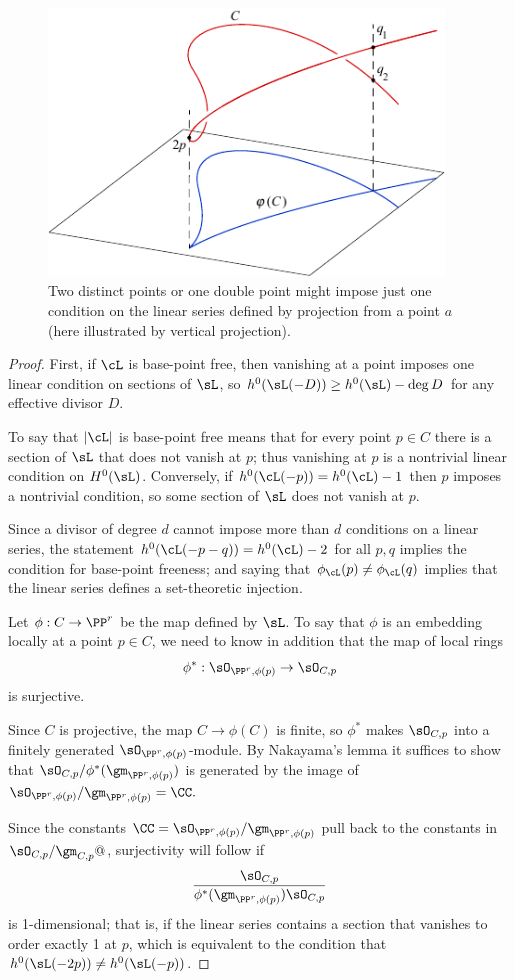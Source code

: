 \begin{figure}
\centerline {\includegraphics[height=2.8in]{"main/Fig01-3"}}
 \caption{Two distinct points or one double point might impose just
   one condition on the linear series defined by projection from a
   point $a$ (here illustrated by vertical projection).
}
\label{not very ample}
\end{figure}

\begin{proof}
First, if $\cL$ is base-point free, then vanishing at a point imposes one linear condition on sections of $\sL$, so
$h^0(\sL(-D)) \geq h^0(\sL)-\deg D$ for any
effective divisor $D$.

To say that $|\cL|$ is base-point free means that for every point $p\in C$ there is a section of $\sL$ that does not vanish at $p$; thus vanishing
at $p$ is a nontrivial linear condition on $H^0(\sL)$. Conversely, if $h^0(\cL(-p)) = h^0(\cL) - 1$ then $p$ imposes a nontrivial condition, so
some section of $\sL$ does not vanish at $p$.

Since a divisor of degree $d$ cannot impose more than $d$ conditions
%
on a linear series, the statement $h^0(\cL(-p-q)) = h^0(\cL) - 2$ for
all $p, q$ implies the condition for base-point freeness; and saying
that $\phi_\cL(p) \neq \phi_\cL(q)$ implies that the linear series
defines a set-theoretic injection.

Let $\phi:C \to \PP^r$ be the map defined by $\sL$. To say that $\phi$  is an embedding locally at a point $p\in C$, we need to know
in addition that the map of local rings
$$
\phi^*: \sO_{\PP^r,\phi(p)} \to \sO_{C,p}
$$
is surjective.

Since $C$ is projective, the map $C\to \phi(C)$ is finite,
so $\phi^*$ makes $\sO_{C,p}$ into a finitely generated $\sO_{\PP^r,\phi(p)}$-module.
By Nakayama's lemma it suffices to show that
$\sO_{C,p}/\phi^*(\gm_{\PP^r,\phi(p)})$
is generated by the image of $\sO_{\PP^r,\phi(p)}/\gm_{\PP^r,\phi(p)} = \CC.$

 Since the constants  $\CC =\sO_{\PP^r,\phi(p)}/\gm_{\PP^r,\phi(p)}$ pull back to the constants in
$\sO_{C,p}/\gm_{C,p}@$,
surjectivity will follow if
$$
\frac{\sO_{C,p}}
{\phi^*(\gm_{\PP^r,\phi(p)})  \sO_{C,p}}
$$
is 1-dimensional; that is, if the linear series contains
a section that vanishes to order exactly 1 at $p$, which is equivalent to the condition
that $h^0(\sL(-2p)) \neq h^0(\sL(-p))$.
\end{proof}

